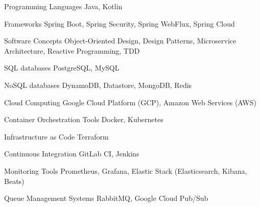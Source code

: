 
\begin{cvskills}

  \cvskill
    {Programming Languages} %
    {Java, Kotlin} %

  \cvskill
    {Frameworks} %
    {Spring Boot, Spring Security, Spring WebFlux, Spring Cloud} %

  \cvskill
    {Software Concepts} %
    {Object-Oriented Design, Design Patterns, Microservice Architecture, Reactive Programming, TDD} %

  \cvskill
    {SQL databases} %
    {PostgreSQL, MySQL} %

  \cvskill
    {NoSQL databases} %
    {DynamoDB, Datastore, MongoDB, Redis} %

  \cvskill
    {Cloud Computing} %
    {Google Cloud Platform (GCP), Amazon Web Services (AWS)} %

  \cvskill
    {Container Orchestration Tools} %
    {Docker, Kubernetes} %

  \cvskill
    {Infrastructure as Code} %
    {Terraform} %

  \cvskill
    {Continuous Integration} %
    {GitLab CI, Jenkins} %

  \cvskill
    {Monitoring Tools} %
    {Prometheus, Grafana, Elastic Stack (Elasticsearch, Kibana, Beats)} %

  \cvskill
    {Queue Management Systems} %
    {RabbitMQ, Google Cloud Pub/Sub} %


\end{cvskills}
